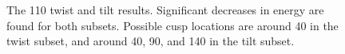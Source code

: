 \documentclass[twoside,senior]{BYUPhys}
\begin{document}
\begin{figure}[ht!]
 \centering
 
 \quad
 \caption[Results for the \textlangle{}110\textrangle{} fitting.]{\label{fig:110} The \textlangle{}110\textrangle{} twist \protect{} and tilt \protect{} results.  Significant decreases in energy are found for both subsets.  Possible cusp locations are around 40\textdegree{} in the twist subset, and around 40\textdegree{}, 90\textdegree{}, and 140\textdegree{} in the tilt subset.}
 
\end{figure}
\end{document}
